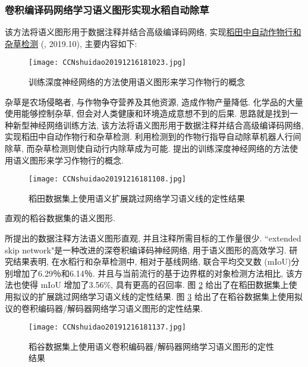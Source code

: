\subsubsection{卷积编译码网络学习语义图形实现水稻自动除草}
该方法将语义图形用于数据注释并结合高级编译码网络, 实现\href{https://doi.org/10.3389/fpls.2019.01404}{稻田中自动作物行和杂草检测} (\cite{Adhikari-2019}, 2019.10), 主要内容如下:
\begin{figure}[H]
    \centering
    \texttt{[image: CCNshuidao20191216181023.jpg]}
    \caption{训练深度神经网络的方法使用语义图形来学习作物行的概念}
    \label{CCNshuidao20191216181023}
    \vspace{-0.4cm}
\end{figure}
杂草是农场侵略者, 与作物争夺营养及其他资源, 造成作物产量降低.
化学品的大量使用能够控制杂草, 但会对人类健康和环境造成意想不到的后果.
思路就是找到一种新型神经网络训练方法, 该方法将语义图形用于数据注释并结合高级编译码网络, 实现稻田中自动作物行和杂草检测.
利用检测到的作物行指导自动除草机器人行间除草, 而杂草检测则使自动行内除草成为可能. 提出的训练深度神经网络的方法使用语义图形来学习作物行的概念.
\begin{figure}[H]
    \centering
    \texttt{[image: CCNshuidao20191216181108.jpg]}
    \caption{稻田数据集上使用语义扩展跳过网络学习语义线的定性结果}
    \label{CCNshuidao20191216181108}
    \vspace{-0.4cm}
\end{figure}

直观的稻谷数据集的语义图形.

所提出的数据注释方法语义图形直观, 并且注释所需目标的工作量很少. ``extended skip network"是一种改进的深卷积编译码神经网络, 用于语义图形的高效学习.
研究结果表明, 在水稻行和杂草检测中, 相对于基线网络, 联合平均交叉数 (mIoU)分别增加了6.29％和6.14％.
并且与当前流行的基于边界框的对象检测方法相比, 该方法也使得 mIoU 增加了3.56\%, 具有更高的召回率.
图 \ref{CCNshuidao20191216181108} 给出了在稻田数据集上使用拟议的扩展跳过网络学习语义线的定性结果.
图 \ref{CCNshuidao20191216181137} 给出了在稻谷数据集上使用拟议的卷积编码器/解码器网络学习语义图形的定性结果.
\begin{figure}[H]
    \centering
    \texttt{[image: CCNshuidao20191216181137.jpg]}
    \caption{稻谷数据集上使用语义卷积编码器/解码器网络学习语义图形的定性结果}
    \label{CCNshuidao20191216181137}
    \vspace{-0.4cm}
\end{figure}
